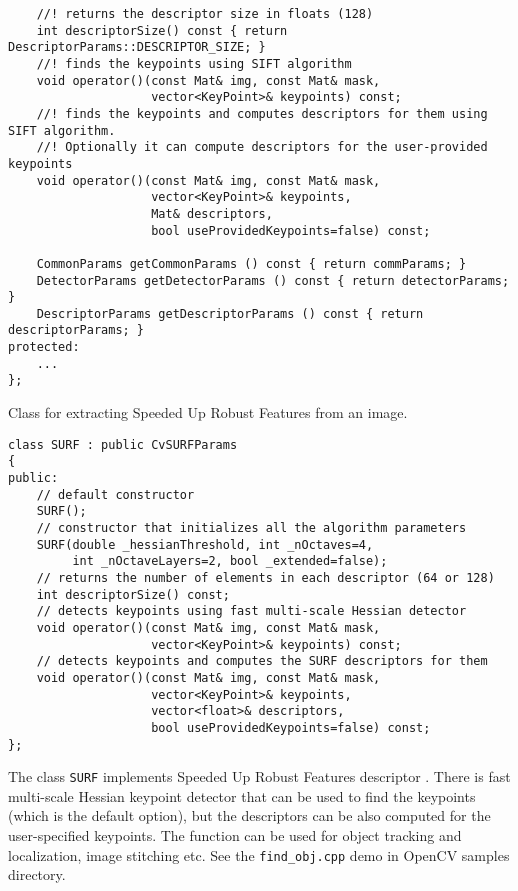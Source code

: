 \begin{lstlisting}
    //! returns the descriptor size in floats (128)
    int descriptorSize() const { return DescriptorParams::DESCRIPTOR_SIZE; }
    //! finds the keypoints using SIFT algorithm
    void operator()(const Mat& img, const Mat& mask,
                    vector<KeyPoint>& keypoints) const;
    //! finds the keypoints and computes descriptors for them using SIFT algorithm. 
    //! Optionally it can compute descriptors for the user-provided keypoints
    void operator()(const Mat& img, const Mat& mask,
                    vector<KeyPoint>& keypoints,
                    Mat& descriptors,
                    bool useProvidedKeypoints=false) const;

    CommonParams getCommonParams () const { return commParams; }
    DetectorParams getDetectorParams () const { return detectorParams; }
    DescriptorParams getDescriptorParams () const { return descriptorParams; }
protected:
    ...
};
\end{lstlisting}

Class for extracting Speeded Up Robust Features from an image.

\begin{lstlisting}
class SURF : public CvSURFParams
{
public:
    // default constructor
    SURF();
    // constructor that initializes all the algorithm parameters
    SURF(double _hessianThreshold, int _nOctaves=4,
         int _nOctaveLayers=2, bool _extended=false);
    // returns the number of elements in each descriptor (64 or 128)
    int descriptorSize() const;
    // detects keypoints using fast multi-scale Hessian detector
    void operator()(const Mat& img, const Mat& mask,
                    vector<KeyPoint>& keypoints) const;
    // detects keypoints and computes the SURF descriptors for them
    void operator()(const Mat& img, const Mat& mask,
                    vector<KeyPoint>& keypoints,
                    vector<float>& descriptors,
                    bool useProvidedKeypoints=false) const;
};
\end{lstlisting}

The class \texttt{SURF} implements Speeded Up Robust Features descriptor \cite{Bay06}.
There is fast multi-scale Hessian keypoint detector that can be used to find the keypoints
(which is the default option), but the descriptors can be also computed for the user-specified keypoints.
The function can be used for object tracking and localization, image stitching etc. See the
\texttt{find\_obj.cpp} demo in OpenCV samples directory.

